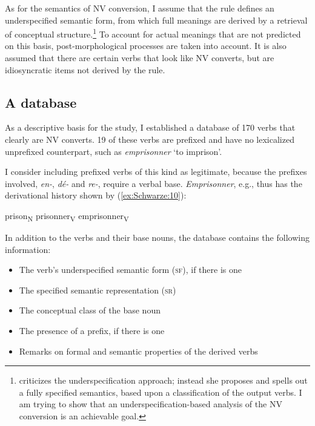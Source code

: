 \documentclass[output=paper]{langsci/langscibook}
\begin{document}
As for the semantics of N\textrightarrow{}V conversion, I assume that the rule defines an underspecified semantic form, from which full meanings are derived by a retrieval of conceptual structure.\footnote{%
\citet[284--290]{Tribout2010a} %
%
criticizes the underspecification approach; instead she proposes and spells out a fully specified semantics, based upon a classification of the output verbs. I am trying to show that an underspecification-based analysis of the  N\textrightarrow{}V conversion is an achievable goal.} To account for actual meanings that are not predicted on this basis, post-morphological processes are taken into account. It is also assumed that there are certain verbs that look like N\textrightarrow{}V converts,
but are idiosyncratic items not derived by the rule.

\subsection{A database}\label{a-database}

As a descriptive basis for the study, I established a database of 170
verbs that clearly are N\textrightarrow{}V converts. 19 of these verbs are prefixed and have no lexicalized unprefixed counterpart, such as \emph{emprisonner}
`to imprison'.

I consider including prefixed verbs of this kind as legitimate, because the prefixes involved, \emph{en-}, \emph{dé-} and \emph{re-}, require a verbal base. \emph{Emprisonner}, e.g., thus has the derivational history shown by (\ref{ex:Schwarze:10}):

\ea\label{ex:Schwarze:10} {{prison}\textsubscript{N}} \textrightarrow{}
{prisonner}\textsubscript{V} \textrightarrow{}
{{emprisonner}\textsubscript{V}}
\z

In addition to the verbs and their base nouns, the database contains the following information:

\begin{itemize}
\item The verb's underspecified semantic form (\textsc{sf}), if there is one

\item The specified semantic representation (\textsc{sr})

\item The conceptual class of the base noun

\item The presence of a prefix, if there is one

\item Remarks on formal and semantic properties of the derived verbs

\end{itemize}
\end{document}
